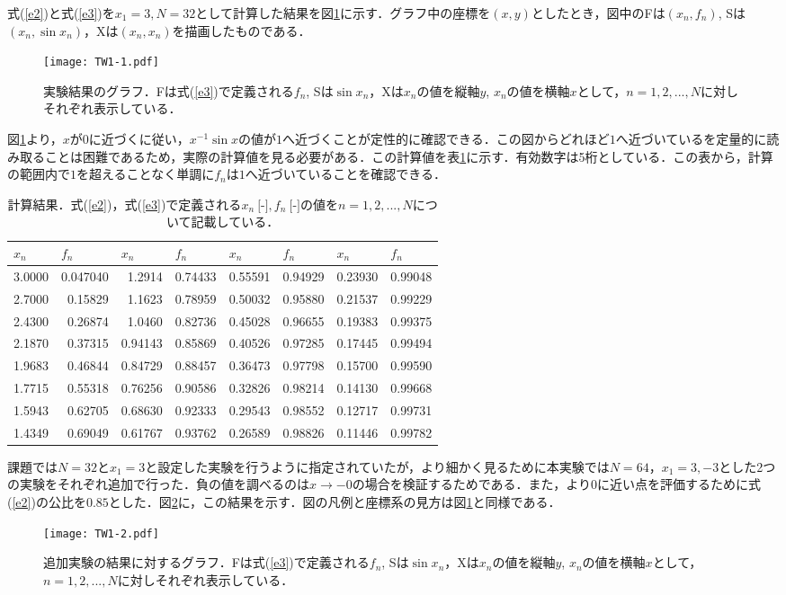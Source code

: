 \documentclass[fleqn, a4paper. 12pt]{ltjsarticle} %
\begin{document}
    式(\ref{e2})と式(\ref{e3})を$x_1=3, N=32$として計算した結果を図\ref{f1}に示す．グラフ中の座標を$(x, y)$としたとき，図中のFは$(x_n, f_n)$, Sは$(x_n, \sin x_n)$，Xは$(x_n, x_n)$を描画したものである．
    \begin{figure}[tb]
        \centering
        \texttt{[image: TW1-1.pdf]}
        \caption{実験結果のグラフ．Fは式(\ref{e3})で定義される$f_n$, Sは$\sin x_n$，Xは$x_n$の値を縦軸$y$, $x_n$の値を横軸$x$として，$n=1,2,...,N$に対しそれぞれ表示している．}
        \label{f1}
    \end{figure}
    図\ref{f1}より，$x$が$0$に近づくに従い，$x^{-1}\sin x$の値が$1$へ近づくことが定性的に確認できる．この図からどれほど$1$へ近づいているを定量的に読み取ることは困難であるため，実際の計算値を見る必要がある．この計算値を表\ref{t1}に示す．有効数字は5桁としている．この表から，計算の範囲内で$1$を超えることなく単調に$f_n$は$1$へ近づいていることを確認できる．
    \begin{table}[tb]
        \centering
        \caption{計算結果．式(\ref{e2})，式(\ref{e3})で定義される$x_n\ \mbox{[-]}, f_n\ \mbox{[-]}$の値を$n=1,2,...,N$について記載している．}
        \begin{tabular}{rr|rr|rr|rr}
\hline
\multicolumn{1}{l}{$x_n$}&\multicolumn{1}{l|}{$f_n$}&\multicolumn{1}{l}{$x_n$}&\multicolumn{1}{l|}{$f_n$}&\multicolumn{1}{l}{$x_n$}&\multicolumn{1}{l|}{$f_n$}&\multicolumn{1}{l}{$x_n$}&\multicolumn{1}{l}{$f_n$}\\
\hline
3.0000&0.047040&1.2914&0.74433&0.55591&0.94929&0.23930&0.99048\\
2.7000&0.15829&1.1623&0.78959&0.50032&0.95880&0.21537&0.99229\\
2.4300&0.26874&1.0460&0.82736&0.45028&0.96655&0.19383&0.99375\\
2.1870&0.37315&0.94143&0.85869&0.40526&0.97285&0.17445&0.99494\\
1.9683&0.46844&0.84729&0.88457&0.36473&0.97798&0.15700&0.99590\\
1.7715&0.55318&0.76256&0.90586&0.32826&0.98214&0.14130&0.99668\\
1.5943&0.62705&0.68630&0.92333&0.29543&0.98552&0.12717&0.99731\\
1.4349&0.69049&0.61767&0.93762&0.26589&0.98826&0.11446&0.99782\\
\hline
        \end{tabular}
        \label{t1}
    \end{table}

    課題では$N=32$と$x_1=3$と設定した実験を行うように指定されていたが，より細かく見るために本実験では$N=64$，$x_1=3, -3$とした2つの実験をそれぞれ追加で行った．負の値を調べるのは$x\to -0$の場合を検証するためである．また，より$0$に近い点を評価するために式(\ref{e2})の公比を$0.85$とした．図\ref{f2}に，この結果を示す．図の凡例と座標系の見方は図\ref{f1}と同様である．
    \begin{figure}[tb]
        \texttt{[image: TW1-2.pdf]}
        \caption{追加実験の結果に対するグラフ．Fは式(\ref{e3})で定義される$f_n$, Sは$\sin x_n$，Xは$x_n$の値を縦軸$y$, $x_n$の値を横軸$x$として，$n=1,2,...,N$に対しそれぞれ表示している．}
        \label{f2}
    \end{figure}
\end{document}

